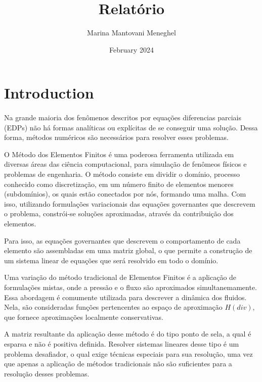 \documentclass[12pt]{article}
\title{Relatório}
\author{Marina Mantovani Meneghel}
\date{February 2024}
\begin{document}
\maketitle

\section{Introduction}
\paragraph{}
Na grande maioria dos fenômenos descritos por equações diferencias parciais (EDPs) não há formas analíticas ou explícitas de se 
conseguir uma solução. Dessa forma, métodos numéricos são necessários para resolver esses problemas.

O Método dos Elementos Finitos é uma poderosa ferramenta utilizada em diversas áreas das ciência computacional, para simulação de 
fenômeos físicos e problemas de engenharia. O método consiste em dividir o domínio, processo conhecido como discretização, em um número 
finito de elementos menores (subdomínios), os quais estão conectados por nós, formando uma malha. Com isso, utilizando formulações 
variacionais das equações governantes que descrevem o problema, constrói-se soluções aproximadas, através da contribuição dos elementos.

Para isso, as equações governantes que descrevem o comportamento de cada elemento são assembladas em uma matriz global, o que permite 
a construção de um sistema linear de equações que será resolvido em todo o domínio.

Uma variação do método tradicional de Elementos Finitos é a aplicação de formulações mistas, onde a pressão e o fluxo são aproximados 
simultanemamente. Essa abordagem é comumente utilizada para descrever a dinâmica dos fluidos. Nela, são consideradas funções pertencentes
ao espaço de aproximação \(H(div)\), que fornece aproximações localmente conservativas. 

A matriz resultante da aplicação desse método é do tipo ponto de sela, a qual é esparsa e não é positiva definida. Resolver sistemas
lineares desse tipo é um problema desafiador, o qual exige técnicas especiais para sua resolução, uma vez que apenas a aplicação de 
métodos tradicionais não são suficientes para a resolução desses problemas.

\end{document}
